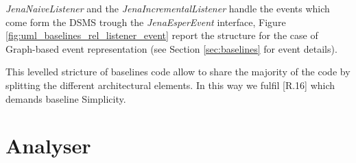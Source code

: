 \textit{JenaNaiveListener} and the  \textit{JenaIncrementalListener} handle the events which come form the DSMS trough the \textit{JenaEsperEvent} interface, Figure \ref{fig:uml_baselines_rel_listener_event} report  the structure for the case of Graph-based event representation (see Section \ref{sec:baselines} for event details). 

This levelled stricture of  baselines code allow to share the majority of the code by splitting the different architectural elements. In this way we fulfil [R.16] which demands baseline Simplicity.




\section{Analyser}\label{sec:analyser-impl}




